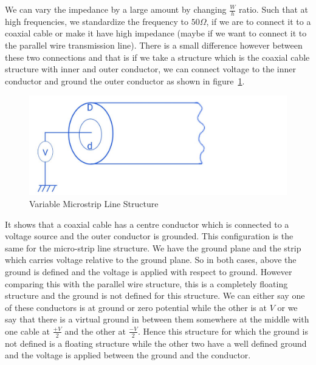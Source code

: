 We can vary the impedance by a large amount by changing $\frac{W}{h}$ ratio. Such that at high frequencies, we standardize the frequency to $50\varOmega$, if we are to connect it to a coaxial cable or make it have high impedance (maybe if we want to connect it to the parallel wire transmission line). There is a small difference however between these two connections and that is if we take a structure which is the coaxial cable structure with inner and outer conductor, we can connect voltage to the inner conductor and ground the outer conductor as shown in figure~\ref{fig:microstripvar}.
\begin{figure}[h]
\centering
\includegraphics[width=1\linewidth]{graphics/variableMicroStripLineStructure}
\caption{Variable Microstrip Line Structure}
\label{fig:microstripvar}
\end{figure}

It shows that a coaxial cable has a centre conductor which is connected to a voltage source and the outer conductor is grounded. This configuration is the same for the micro-strip line structure. We have the ground plane and the strip which carries voltage relative to the ground plane. So in both cases, above the ground is defined and the voltage is applied with respect to ground. However comparing this with the parallel wire structure, this is a completely floating structure and the ground is not defined for this structure. We can either say one of these conductors is at ground or zero potential while the other is at $V$ or we say that there is a virtual ground in between them somewhere at the middle with one cable at $\frac{+V}{2}$ and the other at $\frac{-V}{2}$. Hence this structure for which the ground is not defined is a floating structure while the other two have a well defined ground and the voltage is applied between the ground and the conductor.


